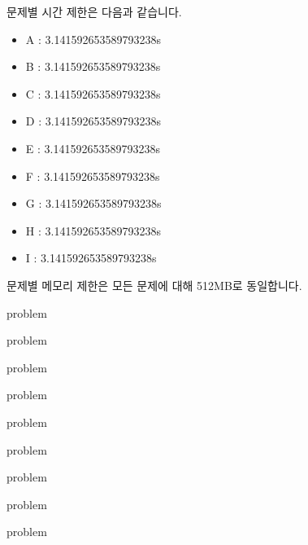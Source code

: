 \documentclass[11pt,a4paper,oneside,final]{article}
\begin{document}
\newpage
문제별 시간 제한은 다음과 같습니다.

\begin{itemize}
\item A : 3.141592653589793238s
\item B : 3.141592653589793238s
\item C : 3.141592653589793238s
\item D : 3.141592653589793238s
\item E : 3.141592653589793238s
\item F : 3.141592653589793238s
\item G : 3.141592653589793238s
\item H : 3.141592653589793238s
\item I : 3.141592653589793238s
\end{itemize}

문제별 메모리 제한은 모든 문제에 대해 512MB로 동일합니다.

\newpage

{problem}

{problem}

{problem}

{problem}

{problem}

{problem}

{problem}

{problem}

{problem}
\end{document}
